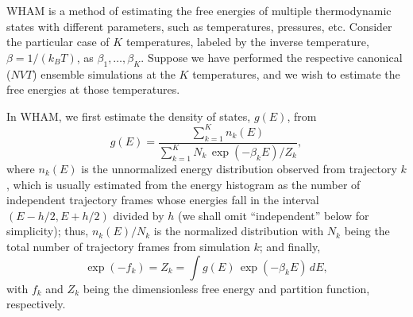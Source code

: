 \documentclass[reprint,aip,jcp,superscriptaddress]{revtex4-1}
\begin{document}
WHAM is a method of
estimating the free energies
of multiple thermodynamic states
with different parameters,
such as temperatures, pressures, etc.
%
Consider the particular case of $K$ temperatures,
labeled by the inverse temperature,
$\beta = 1/(k_B T)$,
as
$\beta_1, \ldots, \beta_K$.
%
Suppose we have performed the respective
canonical ($NVT$) ensemble simulations
at the $K$ temperatures, and
we wish to estimate the free energies
at those temperatures.



In WHAM,
we first estimate the density of states, $g(E)$, from
%
\begin{equation}
g(E)
=
\frac{
  \sum_{k = 1}^K n_k(E)
}
{
  \sum_{k = 1}^K N_k \, \exp(-\beta_k E) / Z_k
},
\label{eq:gE_WHAM}
\end{equation}
%
where
$n_k(E)$
is
the unnormalized energy distribution
observed from trajectory $k$,
which
is usually estimated
from the energy histogram as
the number of independent trajectory frames
whose energies fall in the interval
$(E - h/2, E + h/2)$
divided by $h$
(we shall omit ``independent'' below for simplicity);
%
{
thus, $n_k(E)/N_k$
is the normalized distribution
with $N_k$ being
the total number of trajectory frames
from simulation $k$;
}
%
and finally,
%
\begin{equation}
\exp( - f_k )
=
Z_k
=
\int g(E) \, \exp(-\beta_k E) \, dE,
\label{eq:Z}
\end{equation}
with
$f_k$
and
$Z_k$
being
the dimensionless free energy
and
partition function,
respectively.
\end{document}
